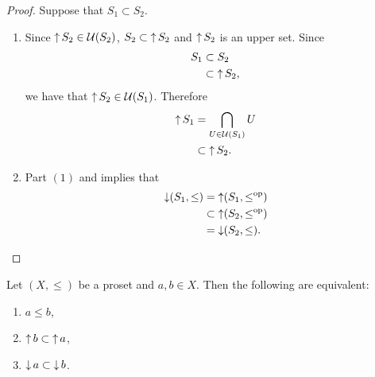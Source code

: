\documentclass{book}
\begin{document}
	\begin{proof} 
		Suppose that $S_1 \subset S_2$.
		\begin{enumerate}
			\item
			Since $\operatorname{\uparrow} S_2 \in \mathcal{U}(S_2)$, $S_2 \subset \operatorname{\uparrow} S_2$ and $\operatorname{\uparrow} S_2$ is an upper set. Since
			\begin{align*}
				S_1 
				& \subset S_2 \\
				& \subset \operatorname{\uparrow} S_2,
			\end{align*} 
			we have that $\operatorname{\uparrow} S_2 \in \mathcal{U}(S_1)$. Therefore
			\begin{align*}
				\operatorname{\uparrow} S_1
				& = \bigcap\limits_{U \in \mathcal{U}(S_1)} U \\
				& \subset \operatorname{\uparrow} S_2.
			\end{align*}
			\item Part $(1)$ and  implies that 
			\begin{align*}
				\operatorname{\downarrow} (S_1, \leq)
				& = \operatorname{\uparrow} (S_1, \leq^{\text{op}}) \\
				& \subset \operatorname{\uparrow} (S_2, \leq^{\text{op}}) \\
				& = \operatorname{\downarrow} (S_2, \leq).
			\end{align*}
		\end{enumerate}
	\end{proof}
	
	\begin{ex} 
		Let $(X, \leq)$ be a proset and $a,b \in X$. Then the following are equivalent:
		\begin{enumerate}
			\item $a \leq b$,
			\item $\operatorname{\uparrow} b \subset \operatorname{\uparrow} a$,
			\item $\operatorname{\downarrow} a \subset \operatorname{\downarrow} b$.
		\end{enumerate}
	\end{ex}
	
\end{document}
